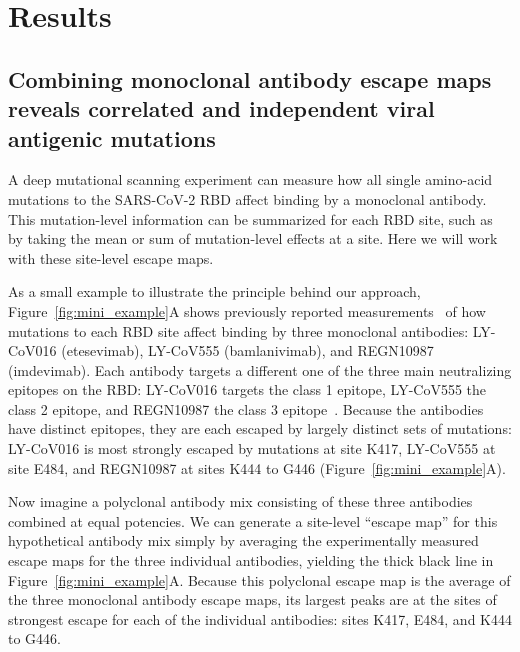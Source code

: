 \documentclass[9pt,twocolumn,twoside]{gsajnl_modified}
\begin{document}
\section{Results}

\subsection{Combining monoclonal antibody escape maps reveals correlated and independent viral antigenic mutations}
A deep mutational scanning experiment can measure how all single amino-acid mutations to the SARS-CoV-2 RBD affect binding by a monoclonal antibody.
This mutation-level information can be summarized for each RBD site, such as by taking the mean or sum of mutation-level effects at a site.
Here we will work with these site-level escape maps.

As a small example to illustrate the principle behind our approach, Figure~\ref{fig:mini_example}A shows previously reported measurements~\citep{starr2021prospective, starr2021complete} of how mutations to each RBD site affect binding by three monoclonal antibodies: LY-CoV016 (etesevimab), LY-CoV555 (bamlanivimab), and REGN10987 (imdevimab).
Each antibody targets a different one of the three main neutralizing epitopes on the RBD: LY-CoV016 targets the class 1 epitope, LY-CoV555 the class 2 epitope, and REGN10987 the class 3 epitope~\citep{barnes2020sars,greaney2021mapping}.
Because the antibodies have distinct epitopes, they are each escaped by largely distinct sets of mutations: LY-CoV016 is most strongly escaped by mutations at site K417, LY-CoV555 at site E484, and REGN10987 at sites K444 to G446 (Figure~\ref{fig:mini_example}A).

Now imagine a polyclonal antibody mix consisting of these three antibodies combined at equal potencies.
We can generate a site-level ``escape map'' for this hypothetical antibody mix simply by averaging the experimentally measured escape maps for the three individual antibodies, yielding the thick black line in Figure~\ref{fig:mini_example}A.
Because this polyclonal escape map is the average of the three monoclonal antibody escape maps, its largest peaks are at the sites of strongest escape for each of the individual antibodies: sites K417, E484, and K444 to G446.
\end{document}
